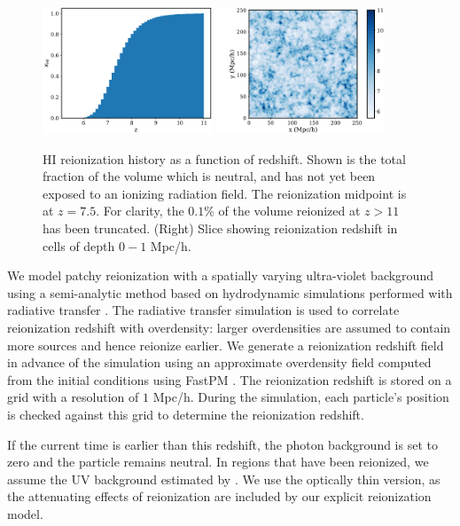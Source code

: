 \documentclass[fleqn,usenatbib]{mnras}
\begin{document}
\begin{figure}
\centering
  \includegraphics[width=0.45\textwidth]{plots/reion_hist.pdf}
    \includegraphics[width=0.45\textwidth]{plots/reion_slice.pdf}
  \caption{HI reionization history as a function of redshift. Shown is the total fraction of the volume which is neutral, and has not yet been exposed to an ionizing radiation field. The reionization midpoint is at $z=7.5$. For clarity, the $0.1\%$ of the volume reionized at $z > 11$ has been truncated. (Right) Slice showing reionization redshift in cells of depth $0-1$ Mpc/h.}
  \label{fig:reion_hist}
\end{figure}

We model patchy reionization with a spatially varying ultra-violet background using a semi-analytic method based on hydrodynamic simulations performed with radiative transfer \citep[for more details see][]{2013ApJ...776...81B}. The radiative transfer simulation is used to correlate reionization redshift with overdensity:  larger overdensities are assumed to contain more sources and hence reionize earlier. We generate a reionization redshift field in advance of the simulation using an approximate overdensity field computed from the initial conditions using FastPM \citep{2016MNRAS.463.2273F}. The reionization redshift is stored on a grid with a resolution of $1$ Mpc/h. During the simulation, each particle's position is checked against this grid to determine the reionization redshift.

If the current time is earlier than this redshift, the photon background is set to zero and the particle remains neutral. In regions that have been reionized, we assume the UV background estimated by \cite{2020MNRAS.493.1614F}. We use the optically thin version, as the attenuating effects of reionization are included by our explicit reionization model.
\end{document}
